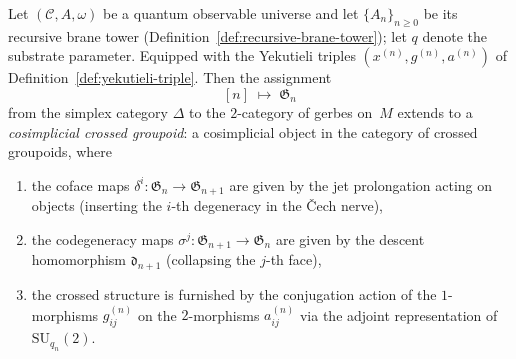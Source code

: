 \begin{proposition}
\label{prop:cosimplicial-crossed-groupoid}
Let $(\mathcal{C}, A, \omega)$ be a quantum observable universe and let
$\{A_n\}_{n \geq 0}$ be its recursive brane tower
(Definition~\ref{def:recursive-brane-tower}); let $q$ denote the substrate parameter.  Equipped with the Yekutieli
triples $(x^{(n)}, g^{(n)}, a^{(n)})$ of
Definition~\ref{def:yekutieli-triple}.  Then the assignment
\[
  [n] \;\longmapsto\; \mathfrak{G}_n
\]
from the simplex category $\Delta$ to the $2$-category of gerbes on~$M$
extends to a \emph{cosimplicial crossed groupoid}: a cosimplicial object
in the category of crossed groupoids, where
\begin{enumerate}
  \item the coface maps $\delta^i \colon \mathfrak{G}_{n} \to
        \mathfrak{G}_{n+1}$ are given by the jet prolongation acting on
        objects (inserting the $i$-th degeneracy in the \v{C}ech nerve),
  \item the codegeneracy maps $\sigma^j \colon \mathfrak{G}_{n+1} \to
        \mathfrak{G}_{n}$ are given by the descent homomorphism
        $\mathfrak{d}_{n+1}$ (collapsing the $j$-th face),
  \item the crossed structure is furnished by the conjugation action of
        the $1$-morphisms $g_{ij}^{(n)}$ on the $2$-morphisms
        $a_{ij}^{(n)}$ via the adjoint representation of
        $\mathrm{SU}_{q_n}(2)$.
\end{enumerate}
\end{proposition}

